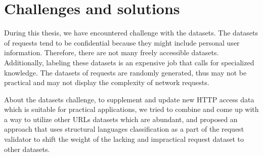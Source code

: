 \section{Challenges and solutions}
\label{sec:challenges_and_solutions}
\hspace{0.5cm}During this thesis, we have encountered challenge with the datasets. The datasets of requests tend to be confidential because they might include personal user information. Therefore, there are not many freely accessible datasets. Additionally, labeling these datasets is an expensive job that calls for specialized knowledge. The datasets of requests are randomly generated, thus may not be practical and may not display the complexity of network requests.

About the datasets challenge, to supplement and update new HTTP access data which is suitable for practical applications, we tried to combine and come up with a way to utilize other URLs datasets which are abundant, and proposed an approach that uses structural languages classification as a part of the request validator to shift the weight of the lacking and impractical request dataset to other datasets.
\newpage
